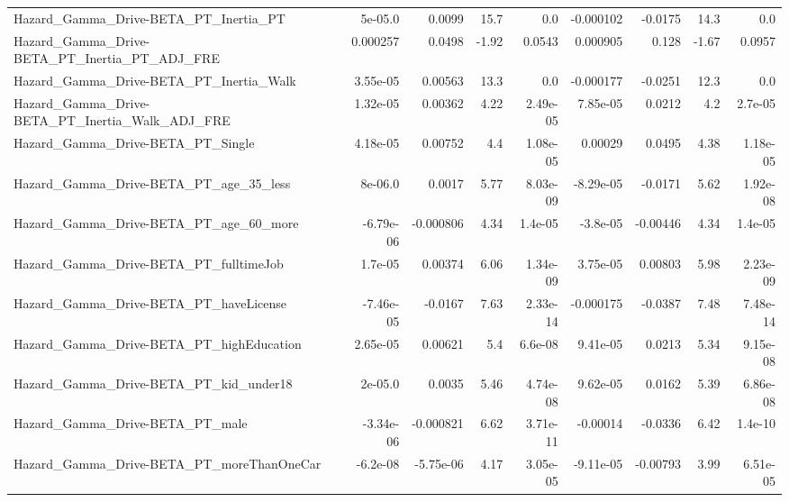 \begin{tabular}{lrrrrrrrr}
Hazard\_Gamma\_Drive-BETA\_PT\_Inertia\_PT              &     5e-05.0 &       0.0099 &     15.7 &      0.0 &  -0.000102 &     -0.0175 &         14.3 &           0.0 \\
Hazard\_Gamma\_Drive-BETA\_PT\_Inertia\_PT\_ADJ\_FRE      &    0.000257 &       0.0498 &    -1.92 &   0.0543 &   0.000905 &       0.128 &        -1.67 &        0.0957 \\
Hazard\_Gamma\_Drive-BETA\_PT\_Inertia\_Walk            &    3.55e-05 &      0.00563 &     13.3 &      0.0 &  -0.000177 &     -0.0251 &         12.3 &           0.0 \\
Hazard\_Gamma\_Drive-BETA\_PT\_Inertia\_Walk\_ADJ\_FRE    &    1.32e-05 &      0.00362 &     4.22 & 2.49e-05 &   7.85e-05 &      0.0212 &          4.2 &       2.7e-05 \\
Hazard\_Gamma\_Drive-BETA\_PT\_Single                  &    4.18e-05 &      0.00752 &      4.4 & 1.08e-05 &    0.00029 &      0.0495 &         4.38 &      1.18e-05 \\
Hazard\_Gamma\_Drive-BETA\_PT\_age\_35\_less             &     8e-06.0 &       0.0017 &     5.77 & 8.03e-09 &  -8.29e-05 &     -0.0171 &         5.62 &      1.92e-08 \\
Hazard\_Gamma\_Drive-BETA\_PT\_age\_60\_more             &   -6.79e-06 &    -0.000806 &     4.34 &  1.4e-05 &   -3.8e-05 &    -0.00446 &         4.34 &       1.4e-05 \\
Hazard\_Gamma\_Drive-BETA\_PT\_fulltimeJob             &     1.7e-05 &      0.00374 &     6.06 & 1.34e-09 &   3.75e-05 &     0.00803 &         5.98 &      2.23e-09 \\
Hazard\_Gamma\_Drive-BETA\_PT\_haveLicense             &   -7.46e-05 &      -0.0167 &     7.63 & 2.33e-14 &  -0.000175 &     -0.0387 &         7.48 &      7.48e-14 \\
Hazard\_Gamma\_Drive-BETA\_PT\_highEducation           &    2.65e-05 &      0.00621 &      5.4 &  6.6e-08 &   9.41e-05 &      0.0213 &         5.34 &      9.15e-08 \\
Hazard\_Gamma\_Drive-BETA\_PT\_kid\_under18             &     2e-05.0 &       0.0035 &     5.46 & 4.74e-08 &   9.62e-05 &      0.0162 &         5.39 &      6.86e-08 \\
Hazard\_Gamma\_Drive-BETA\_PT\_male                    &   -3.34e-06 &    -0.000821 &     6.62 & 3.71e-11 &   -0.00014 &     -0.0336 &         6.42 &       1.4e-10 \\
Hazard\_Gamma\_Drive-BETA\_PT\_moreThanOneCar          &    -6.2e-08 &    -5.75e-06 &     4.17 & 3.05e-05 &  -9.11e-05 &    -0.00793 &         3.99 &      6.51e-05 \\

\end{tabular}
